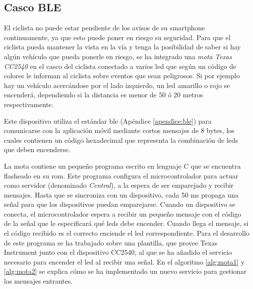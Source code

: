 \subsection{Casco BLE}\label{ssection:cascoBLE}
El ciclista no puede estar pendiente de los avisos de su smartphone
continuamente, ya que esto puede poner en riesgo su seguridad. Para que el
ciclista pueda mantener la vista en la vía y tenga la posibilidad de saber si
hay algún vehículo que pueda ponerle en riesgo, se ha integrado una \emph{mota
Texas CC2540} en el casco del ciclista conectado a varios led que según un
código de colores le informan al ciclista sobre eventos que sean peligrosos.
Si por ejemplo hay un vehículo acercándose por el lado izquierdo, un led
amarillo o rojo se encenderá, dependiendo si la distancia es menor de 50 ó 20
metros respectivamente.

Este dispositivo utiliza el estándar \gls{ble} (Apéndice \ref{apendice:ble})
para comunicarse con la aplicación móvil mediante cortos mensajes de 8 bytes,
los cuales contienen un código hexadecimal que representa la combinación de
leds que deben encenderse.

La mota contiene un pequeño programa escrito en	lenguaje C que se encuentra
flasheado en su \gls{rom}. Este programa configura el microcontrolador para
actuar como servidor (denominado \emph{Central}), a la espera de ser
emparejado y recibir mensajes. Hasta que se sincroniza con un dispositivo,
cada 50 ms propaga una señal para que los dispositivos puedan emparejarse.
Cuando un dispositivo se conecta, el microcontrolador espera a recibir un
pequeño mensaje con el código de la señal que le especificará qué	leds debe
encender. Cuando llega el mensaje, si el código recibido es el correcto
enciende el led correspondiente. Para el desarrollo de este programa se ha
trabajado sobre una plantilla, que provee Texas Instrument junto con el
dispositivo CC2540,	al que se ha añadido el servicio necesario para encender
el led al recibir una señal. En el algoritmo \ref{alg:mota1} y \ref{alg:mota2}
se explica cómo se ha implementado un nuevo servicio para gestionar los
mensajes entrantes.

